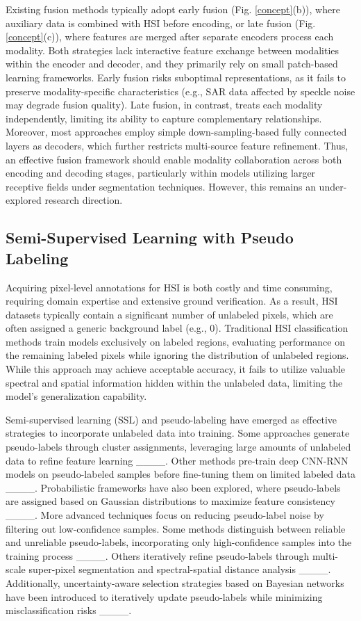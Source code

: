 Existing fusion methods typically adopt early fusion (Fig. \ref{concept}(b)), where auxiliary data is combined with HSI before encoding, or late fusion (Fig. \ref{concept}(c)), where features are merged after separate encoders process each modality. Both strategies lack interactive feature exchange between modalities within the encoder and decoder, and they primarily rely on small patch-based learning frameworks. Early fusion risks suboptimal representations, as it fails to preserve modality-specific characteristics (e.g., SAR data affected by speckle noise may degrade fusion quality). Late fusion, in contrast, treats each modality independently, limiting its ability to capture complementary relationships. Moreover, most approaches employ simple down-sampling-based fully connected layers as decoders, which further restricts multi-source feature refinement. Thus, an effective fusion framework should enable modality collaboration across both encoding and decoding stages, particularly within models utilizing larger receptive fields under segmentation techniques. However, this remains an under-explored research direction.


\subsection{Semi-Supervised Learning with Pseudo Labeling}
Acquiring pixel-level annotations for HSI is both costly and time consuming, requiring domain expertise and extensive ground verification. As a result, HSI datasets typically contain a significant number of unlabeled pixels, which are often assigned a generic background label (e.g., 0). Traditional HSI classification methods train models exclusively on labeled regions, evaluating performance on the remaining labeled pixels while ignoring the distribution of unlabeled regions. While this approach may achieve acceptable accuracy, it fails to utilize valuable spectral and spatial information hidden within the unlabeled data, limiting the model’s generalization capability.

Semi-supervised learning (SSL) and pseudo-labeling have emerged as effective strategies to incorporate unlabeled data into training. Some approaches generate pseudo-labels through cluster assignments, leveraging large amounts of unlabeled data to refine feature learning ____. Other methods pre-train deep CNN-RNN models on pseudo-labeled samples before fine-tuning them on limited labeled data ____. Probabilistic frameworks have also been explored, where pseudo-labels are assigned based on Gaussian distributions to maximize feature consistency ____. More advanced techniques focus on reducing pseudo-label noise by filtering out low-confidence samples. Some methods distinguish between reliable and unreliable pseudo-labels, incorporating only high-confidence samples into the training process ____. Others iteratively refine pseudo-labels through multi-scale super-pixel segmentation and spectral-spatial distance analysis ____. Additionally, uncertainty-aware selection strategies based on Bayesian networks have been introduced to iteratively update pseudo-labels while minimizing misclassification risks ____.

